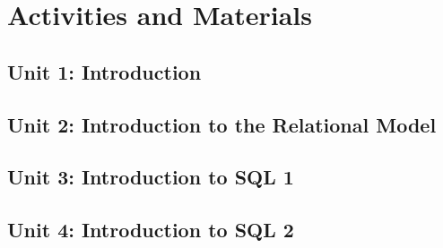 \section{Activities and Materials}

\subsection{Unit 1: Introduction}

%




\subsection{Unit 2: Introduction to the Relational Model}

%






\subsection{Unit 3: Introduction to SQL 1}

%






\subsection{Unit 4: Introduction to SQL 2}

